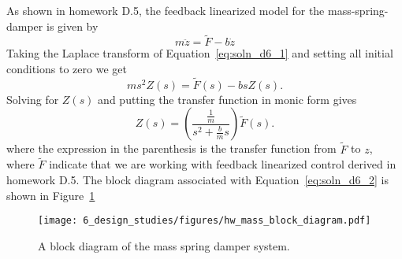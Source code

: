 
As shown in homework D.5, the feedback linearized model for the mass-spring-damper is given by 
\begin{equation}\label{eq:soln_d6_1}
m\ddot{z} = \tilde{F} - b\dot{z}
\end{equation}
Taking the Laplace transform of Equation~\eqref{eq:soln_d6_1} and setting all initial conditions to zero we get
\[
ms^2Z(s) = \tilde{F}(s) - bsZ(s).
\]
Solving for $Z(s)$ and putting the transfer function in monic form gives
\begin{equation}\label{eq:soln_d6_2}
Z(s) = \left(\frac{\frac{1}{m}}{s^2 + \frac{b}{m}s}\right)\tilde{F}(s).
\end{equation}
where the expression in the parenthesis is the transfer function from $\tilde{F}$ to $z$, where $\tilde{F}$ indicate that we are working with feedback linearized control derived in homework D.5. The block diagram associated with Equation~\eqref{eq:soln_d6_2} is shown in Figure~\ref{fig:hw_mass_block_diagram}
\begin{figure}[htbp]
   \centering
   \texttt{[image: 6\_design\_studies/figures/hw\_mass\_block\_diagram.pdf]}
   \caption{A block diagram of the mass spring damper system.}
   \label{fig:hw_mass_block_diagram}
\end{figure} 
